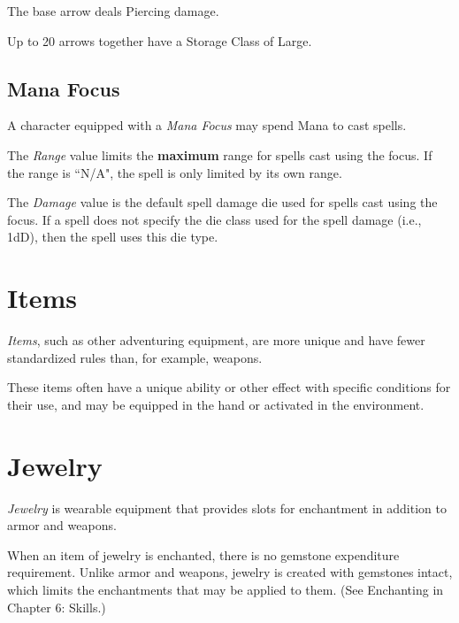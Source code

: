 The base arrow deals  Piercing damage.

\vspace{0.4em}

Up to 20 arrows together have a Storage Class of Large.



\subsection{Mana Focus}
A character equipped with a \textit{Mana Focus} may spend Mana to cast spells.

\vspace{0.4em}

The \textit{Range} value limits the \textbf{maximum} range for spells cast using the focus.
If the range is ``N/A", the spell is only limited by its own range.

\vspace{0.4em}

The \textit{Damage} value is the default spell damage die used for spells cast using the focus.
If a spell does not specify the die class used for the spell damage (i.e., 1dD),
then the spell uses this die type.




\section{Items}
\textit{Items}, such as other adventuring equipment, 
are more unique and have fewer standardized rules than, for example, weapons.

\vspace{0.4em}

These items often have a unique ability or other effect with specific conditions for their use,
and may be equipped in the hand or activated in the environment.




\section{Jewelry}
\textit{Jewelry} is wearable equipment that provides slots for enchantment in 
addition to armor and weapons.

\vspace{0.4em}

When an item of jewelry is enchanted, there is no gemstone expenditure requirement.
Unlike armor and weapons, jewelry is created with gemstones intact,
which limits the enchantments that may be applied to them. 
(See Enchanting in Chapter 6: Skills.)

